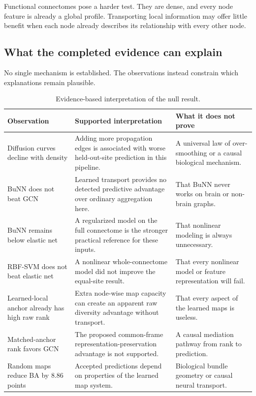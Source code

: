 \documentclass[11pt,a4paper]{article}
\begin{document}
Functional connectomes pose a harder test. They are dense, and every node
feature is already a global profile. Transporting local information may offer
little benefit when each node already describes its relationship with every
other node.

\subsection{What the completed evidence can explain}

No single mechanism is established. The observations instead constrain which
explanations remain plausible.

\begin{table}[htbp]
\centering
\caption{Evidence-based interpretation of the null result.}
\label{tab:explanation}
\small
\begin{tabularx}{\textwidth}{@{}p{3.1cm}Y Y@{}}
\toprule
\textbf{Observation} & \textbf{Supported interpretation} & \textbf{What it does not prove} \\
\midrule
Diffusion curves decline with density & Adding more propagation edges is associated with worse held-out-site prediction in this pipeline. & A universal law of over-smoothing or a causal biological mechanism. \\
BuNN does not beat GCN & Learned transport provides no detected predictive advantage over ordinary aggregation here. & That BuNN never works on brain or non-brain graphs. \\
BuNN remains below elastic net & A regularized model on the full connectome is the stronger practical reference for these inputs. & That nonlinear modeling is always unnecessary. \\
RBF-SVM does not beat elastic net & A nonlinear whole-connectome model did not improve the equal-site result. & That every nonlinear model or feature representation will fail. \\
Learned-local anchor already has high raw rank & Extra node-wise map capacity can create an apparent raw diversity advantage without transport. & That every aspect of the learned maps is useless. \\
Matched-anchor rank favors GCN & The proposed common-frame representation-preservation advantage is not supported. & A causal mediation pathway from rank to prediction. \\
Random maps reduce BA by 8.86 points & Accepted predictions depend on properties of the learned map system. & Biological bundle geometry or causal neural transport. \\

\end{tabularx}
\end{table}
\end{document}
